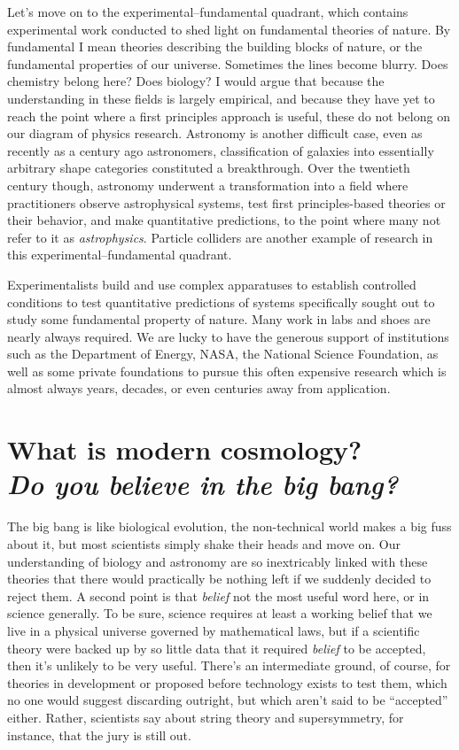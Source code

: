 Let's move on to the experimental--fundamental quadrant, which contains experimental work conducted to shed light on fundamental theories of nature. By fundamental I mean theories describing the building blocks of nature, or the fundamental properties of our universe. Sometimes the lines become blurry. Does chemistry belong here? Does biology? I would argue that because the understanding in these fields is largely empirical, and because they have yet to reach the point where a first principles approach is useful, these do not belong on our diagram of physics research. Astronomy is another difficult case, even as recently as a century ago astronomers, classification of galaxies into essentially arbitrary shape categories constituted a breakthrough. Over the twentieth century though, astronomy underwent a transformation into a field where practitioners observe astrophysical systems, test first principles-based theories or their behavior, and make quantitative predictions, to the point where many not refer to it as \emph{astrophysics}. Particle colliders are another example of research in this experimental--fundamental quadrant. 
 
Experimentalists build and use complex apparatuses to establish controlled conditions to test quantitative predictions of systems specifically sought out to study some fundamental property of nature. Many work in labs and shoes are nearly always required. We are lucky to have the generous support of institutions such as the Department of Energy, NASA, the National Science Foundation, as well as some private foundations to pursue this often expensive research which is almost always years, decades, or even centuries away from application.


\section[What is modern cosmology? \emph{Do you believe in the big bang?}]{What is modern cosmology?\\ \emph{\large{Do you believe in the big bang?}}}

The big bang is like biological evolution, the non-technical world makes a big fuss about it, but most scientists simply shake their heads and move on. Our understanding of biology and astronomy are so inextricably linked with these theories that there would practically be nothing left if we suddenly decided to reject them. A second point is that \textit{belief} not the most useful word here, or in science generally. To be sure, science requires at least a working belief that we live in a physical universe governed by mathematical laws, but if a scientific theory were backed up by so little data that it required \textit{belief} to be accepted, then it's unlikely to be very useful. There's an intermediate ground, of course, for theories in development or proposed before technology exists to test them, which no one would suggest discarding outright, but which aren't said to be ``accepted'' either. Rather, scientists say about string theory and supersymmetry, for instance, that the jury is still out.


